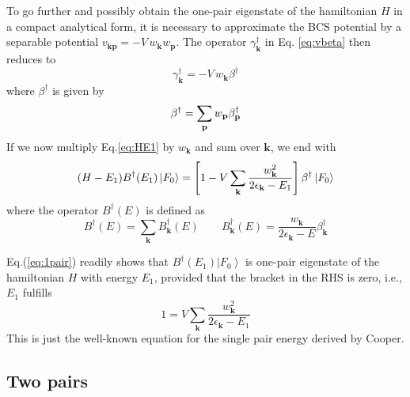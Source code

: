 \documentclass[epj]{svjour}
\newcommand{\vk}{\ensuremath{\mathbf{k}}}
\newcommand{\vp}{\ensuremath{\mathbf{p}}}
\begin{document}
To go further and possibly obtain the one-pair eigenstate of the hamiltonian $H$
in a compact analytical form, it is necessary to approximate the BCS potential by a separable potential $v_{\mathbf{k} \mathbf{p} }=-V\,w_\vk{}w_\vp$.
The operator $\gamma^\dagger_\vk$ in Eq. \eqref{eq:vbeta} then reduces to  
\begin{equation}\gamma^{\dagger}_\vk=-V\,w_\vk\beta^{\dagger}
\end{equation} 
where $\beta^\dagger$ is given by
\begin{equation}  \label{eq:gammaBeta}
\beta^{\dagger}=\sum_%
\vp{}w_\vp\beta^{\dagger}_\vp
\end{equation}
If we  now multiply Eq.\eqref{eq:HE1} by $w_\vk$ and sum over $\mathbf{k} $,
we end with 
\begin{equation}\label{eq:1pair}
(H-E _1)B^{\dagger}(E _1)\left|F_0\right>  =\left[1-V\sum_\vk{%
\frac{w_\vk^2}{2\epsilon_\vk-E _1}}\right]
\beta^{\dagger}\left|F_0\right>  
\end{equation}
where the operator $B^{\dagger}(E)$ is defined as  
\begin{equation}  \label{eq:B}
B^{\dagger}(E)=\sum_\vk{B_\vk^{\dagger}(E)}\quad\quad B_\vk^{\dagger}(E)=\frac{w_\vk}{2\epsilon_\vk-E}\beta^{\dagger}_\vk
\end{equation}

Eq.(\ref{eq:1pair}) readily shows that  $B^{\dagger}(%
E _1)\left|F_0\right> $ is  one-pair eigenstate of the hamiltonian $H$ with energy  $%
E _1$, provided that the bracket in the RHS is zero, i.e., $E_1$  fulfills
\begin{equation}  \label{eq:SchOne}
1=V\sum_\vk{\frac{w_\vk^2}{2\epsilon_\vk-E _1}}
\end{equation}
This is just the well-known equation for the single pair energy
derived by Cooper.

\subsection{Two pairs}
\end{document}
